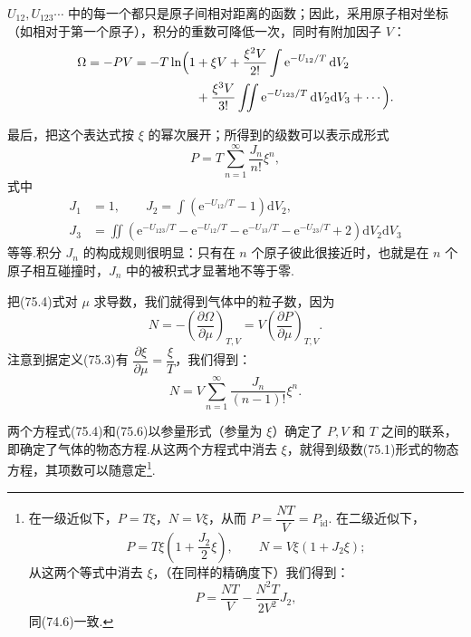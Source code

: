 $U_{12},U_{123}\cdots$ 中的每一个都只是原子间相对距离的函数；因此，采用原子相对坐标（如相对于第一个原子），积分的重数可降低一次，同时有附加因子 $V$：
\begin{equation*}
\begin{aligned}
  \Omega=-PV=-T\ln\Bigl(1&+\xi V+\frac{\xi^2V}{2!}\int\mathrm{e}^{-U_{12}/T}\,\mathrm{d}V_2\\
  &+\frac{\xi^3V}{3!}\iint\mathrm{e}^{-U_{123}/T}\,\mathrm{d}V_2\mathrm{d}V_3+\cdots\Bigr).
\end{aligned}
\end{equation*}

最后，把这个表达式按 $\xi$ 的幂次展开；所得到的级数可以表示成形式
\begin{equation}
  P=T\sum_{n=1}^{\infty}\frac{J_n}{n!}\xi^n,
\end{equation}
式中
\begin{equation}
\begin{aligned}
  J_1&=1,\qquad J_2=\int\left(\mathrm{e}^{-U_{12}/T}-1\right)\mathrm{d}V_2,\\
  J_3&=\iint\left(\mathrm{e}^{-U_{123}/T}-\mathrm{e}^{-U_{12}/T}
  -\mathrm{e}^{-U_{13}/T}-\mathrm{e}^{-U_{23}/T}+2\right)\mathrm{d}V_2\mathrm{d}V_3
\end{aligned}
\end{equation}
等等.积分 $J_n$ 的构成规则很明显：只有在 $n$ 个原子彼此很接近时，也就是在 $n$ 个原子相互碰撞时，$J_n$ 中的被积式才显著地不等于零.

把(75.4)式对 $\mu$ 求导数，我们就得到气体中的粒子数，因为
\begin{equation*}
  N=-\left(\frac{\partial\Omega}{\partial\mu}\right)_{T,V}
  =V\left(\frac{\partial P}{\partial\mu}\right)_{T,V}.
\end{equation*}
注意到据定义(75.3)有 $\dfrac{\partial\xi}{\partial\mu}=\dfrac{\xi}{T}$，我们得到：
\begin{equation}
  N=V\sum_{n=1}^{\infty}\frac{J_n}{(n-1)!}\xi^n.
\end{equation}

两个方程式(75.4)和(75.6)以参量形式（参量为 $\xi$）确定了 $P,V$ 和 $T$ 之间的联系，即确定了气体的物态方程.从这两个方程式中消去 $\xi$，就得到级数(75.1)形式的物态方程，其项数可以随意定\footnote{在一级近似下，$P=T\xi$，$N=V\xi$，从而 $P=\dfrac{NT}{V}=P_{\mathrm{id}}$. 在二级近似下，
\begin{equation*}
  P=T\xi\left(1+\frac{J_2}{2}\xi\right),\qquad N=V\xi(1+J_2\xi);
\end{equation*}
从这两个等式中消去 $\xi$，（在同样的精确度下）我们得到：
\begin{equation*}
  P=\frac{NT}{V}-\frac{N^2T}{2V^2}J_2,
\end{equation*}
同(74.6)一致.}.

